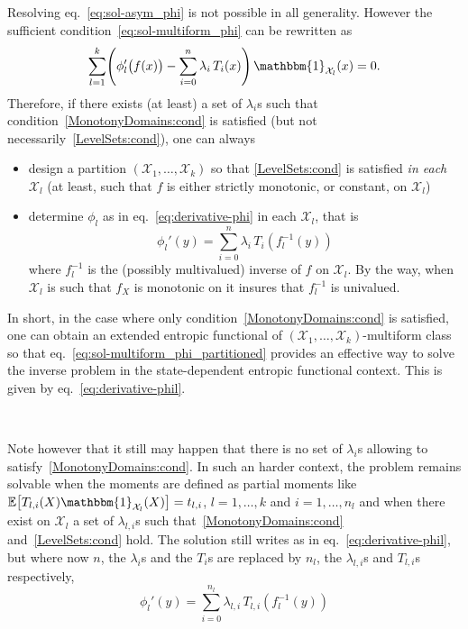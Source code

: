 \documentclass[entropy,article,submit,moreauthors,pdftex]{Definitions/mdpi}
\newcommand{\SZ}[1]{{\color{blue} #1}}                                       %
\def\X{\mathcal{X}}%
\def\un{\mathbbm{1}}%
\newcommand{\Esp}[1]{\mathbb{E}\left[ #1 \right]}%
\begin{document}
\SZ{Resolving} eq.~\eqref{eq:sol-asym_phi}  is not  possible in  all generality.
However the  sufficient condition~\eqref{eq:sol-multiform_phi} can  be rewritten
as
%
\begin{equation}\label{eq:sol-multiform_phi_partitioned}
\sum_{l=1}^k \left( \phi_l'\big(f(x)\big) - \sum_{i=0}^n \lambda_i \, T_i(x)
\right) \, \un_{\X_l}(x) = 0.
\end{equation}
%
\SZ{Therefore},  if there  exists  (at least)  a set  of  $\lambda_i$s such  that
condition~\ref{MonotonyDomains:cond}       is      satisfied       (but      not
necessarily~\ref{LevelSets:cond}), one can always
%
\begin{itemize}
\item design  a partition  $(\X_1,\ldots,\X_k)$ so that  \ref{LevelSets:cond} is
  satisfied {\em  in each $\X_l$}  (at least, such  that $f$ is  either strictly
  monotonic, or constant, on $\X_l$)
%
\item  determine $\phi_l$  as in  eq.~\eqref{eq:derivative-phi} in  each $\X_l$,
  that is
  \begin{equation}\label{eq:derivative-phil}
  \phi_l'(y) = \sum_{i=0}^n \lambda_i \, T_i \left(f_l^{-1}(y)\right)
  \end{equation}
  where   $f_l^{-1}$  is   the  (possibly   multivalued)  inverse   of  $f$   on
  $\X_l$. \SZ{By  the way,  when $\X_l$ is  such that $f_X$  is monotonic  on it
    insures that $f_l^{-1}$ is univalued.}
\end{itemize}

In  short,  in  the  case  where  only  condition~\ref{MonotonyDomains:cond}  is
satisfied,    one   can    obtain   an    extended   entropic    functional   of
$(\X_1,\ldots,\X_k)$-multiform             class             so             that
eq.~\eqref{eq:sol-multiform_phi_partitioned} provides an  effective way to solve
the inverse problem in the state-dependent entropic functional context. \SZ{This
  is given by eq.~\eqref{eq:derivative-phil}.}

\

Note however  that it  still may  happen that  there is  no set  of $\lambda_i$s
allowing to satisfy~\ref{MonotonyDomains:cond}.  In  such an harder context, the
problem remains  solvable when the moments  are defined as partial  moments like
$\Esp{T_{l,i}(X) \un_{\X_l}(X)} =  t_{l,i}$, $l = 1 ,  \ldots , k$ and $i  = 1 ,
\ldots ,  n_l$ and  when there exist  on $\X_l$ a  set of  $\lambda_{l,i}$s such
that~\ref{MonotonyDomains:cond}  and~\ref{LevelSets:cond}  hold.   The  solution
still  writes  as in  eq.~\eqref{eq:derivative-phil},  but  where now  $n$,  the
$\lambda_i$s  and the  $T_i$s are  replaced by  $n_l$, the  $\lambda_{l,i}$s and
$T_{l,i}$s respectively,
%
\SZ{
\begin{equation}\label{eq:derivative-phil-partial}
\phi_l'(y) = \sum_{i=0}^{n_l} \lambda_{l,i} \, T_{l,i} \left(f_l^{-1}(y)\right)
\end{equation}
}
\end{document}

